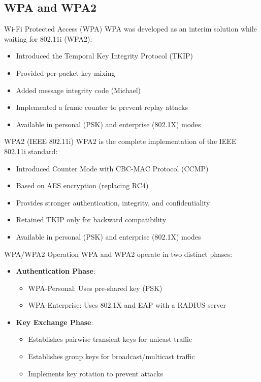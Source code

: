 \subsection{WPA and WPA2}

\begin{definition}{Wi-Fi Protected Access (WPA)}
WPA was developed as an interim solution while waiting for 802.11i (WPA2):
\begin{itemize}
    \item Introduced the Temporal Key Integrity Protocol (TKIP)
    \item Provided per-packet key mixing
    \item Added message integrity code (Michael)
    \item Implemented a frame counter to prevent replay attacks
    \item Available in personal (PSK) and enterprise (802.1X) modes
\end{itemize}
\end{definition}

\begin{definition}{WPA2 (IEEE 802.11i)}
WPA2 is the complete implementation of the IEEE 802.11i standard:
\begin{itemize}
    \item Introduced Counter Mode with CBC-MAC Protocol (CCMP)
    \item Based on AES encryption (replacing RC4)
    \item Provides stronger authentication, integrity, and confidentiality
    \item Retained TKIP only for backward compatibility
    \item Available in personal (PSK) and enterprise (802.1X) modes
\end{itemize}
\end{definition}

\begin{concept}{WPA/WPA2 Operation}
WPA and WPA2 operate in two distinct phases:
\begin{itemize}
    \item \textbf{Authentication Phase}:
    \begin{itemize}
        \item WPA-Personal: Uses pre-shared key (PSK)
        \item WPA-Enterprise: Uses 802.1X and EAP with a RADIUS server
    \end{itemize}
    \item \textbf{Key Exchange Phase}:
    \begin{itemize}
        \item Establishes pairwise transient keys for unicast traffic
        \item Establishes group keys for broadcast/multicast traffic
        \item Implements key rotation to prevent attacks
    \end{itemize}
\end{itemize}
\end{concept}

